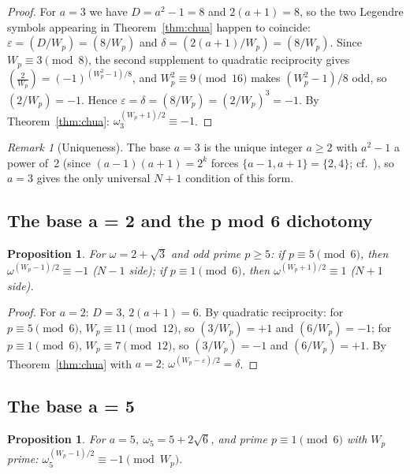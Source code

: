 \documentclass[12pt]{article}
\theoremstyle{plain}
\newtheorem{proposition}[theorem]{Proposition}
\theoremstyle{definition}
\theoremstyle{remark}
\newtheorem{remark}[theorem]{Remark}
\begin{document}
\begin{proof}
For \(a = 3\) we have \(D = a^2 - 1 = 8\) and
\(2(a+1) = 8\), so the two Legendre symbols appearing in
Theorem~\ref{thm:chua} happen to coincide:
\(\varepsilon = (D/W_p) = (8/W_p)\) and
\(\delta = (2(a+1)/W_p) = (8/W_p)\). Since
\(W_p \equiv 3 \pmod{8}\), the second supplement to quadratic
reciprocity gives
\(\left(\tfrac{2}{W_p}\right) = (-1)^{(W_p^2-1)/8}\), and
\(W_p^2 \equiv 9 \pmod{16}\) makes \((W_p^2 - 1)/8\) odd, so
\((2/W_p) = -1\). Hence
\(\varepsilon = \delta = (8/W_p) = (2/W_p)^3 = -1\). By
Theorem~\ref{thm:chua}: \(\omega_3^{(W_p+1)/2} \equiv -1\).\end{proof}


\begin{remark}[Uniqueness]\label{rem:uniqueness}
The base \(a = 3\) is the unique integer \(a \geq 2\) with
\(a^2 - 1\) a power of~2 (since \((a-1)(a+1) = 2^k\) forces
\(\{a-1,a+1\} = \{2,4\}\); cf.\ \cite{ref14}), so \(a = 3\) gives
the only universal \(N+1\) condition of this form.
\end{remark}


\subsection{The base a = 2 and the p mod 6 dichotomy}


\begin{proposition}\label{prop:base-2}
For \(\omega = 2 + \sqrt{3}\) and odd prime
\(p \geq 5\): if \(p \equiv 5 \pmod{6}\), then
\(\omega^{(W_p-1)/2} \equiv -1\) (\(N-1\) side); if
\(p \equiv 1 \pmod{6}\), then \(\omega^{(W_p+1)/2} \equiv 1\)
(\(N+1\) side).
\end{proposition}


\begin{proof}
For \(a = 2\): \(D = 3\), \(2(a+1) = 6\). By quadratic
reciprocity: for \(p \equiv 5 \pmod{6}\),
\(W_p \equiv 11 \pmod{12}\), so \((3/W_p) = +1\) and
\((6/W_p) = -1\); for \(p \equiv 1 \pmod{6}\),
\(W_p \equiv 7 \pmod{12}\), so \((3/W_p) = -1\) and
\((6/W_p) = +1\). By Theorem~\ref{thm:chua} with \(a = 2\):
\(\omega^{(W_p - \varepsilon)/2} = \delta\).\end{proof}


\subsection{The base a = 5}


\begin{proposition}\label{prop:base-5}
For \(a = 5\), \(\omega_5 = 5 + 2\sqrt{6}\),
and prime \(p \equiv 1 \pmod{6}\) with \(W_p\) prime:
\(\omega_5^{(W_p-1)/2} \equiv -1 \pmod{W_p}\).
\end{proposition}
\end{document}
